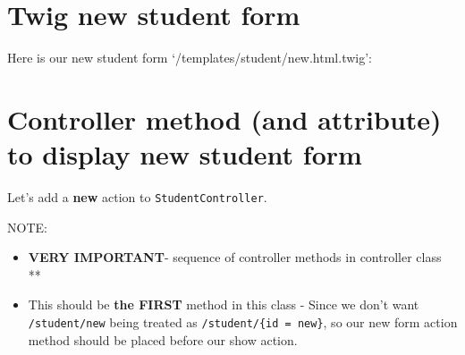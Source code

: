 \documentclass[a4paperpaper,openright]{book}
\newenvironment{Shaded}{}{}
\newcommand{\KeywordTok}[1]{\textcolor[rgb]{0.00,0.44,0.13}{\textbf{#1}}}
\newcommand{\NormalTok}[1]{#1}
\newcommand{\OtherTok}[1]{\textcolor[rgb]{0.00,0.44,0.13}{#1}}
\newcommand{\StringTok}[1]{\textcolor[rgb]{0.25,0.44,0.63}{#1}}
\begin{document}
\hypertarget{twig-new-student-form}{%
\section{Twig new student form}\label{twig-new-student-form}}

Here is our new student form `/templates/student/new.html.twig':

\begin{Shaded}
\end{Shaded}

\hypertarget{controller-method-and-attribute-to-display-new-student-form}{%
\section{Controller method (and attribute) to display new student
form}\label{controller-method-and-attribute-to-display-new-student-form}}

Let's add a \textbf{new} action to \texttt{StudentController}.

NOTE:

\begin{itemize}
\item
  \textbf{VERY IMPORTANT}- sequence of controller methods in controller
  class **
\item
  This should be \textbf{the FIRST} method in this class - Since we
  don't want \texttt{/student/new} being treated as
  \texttt{/student/\{id\ =\ \textquotesingle{}new\textquotesingle{}\}},
  so our new form action method should be placed before our show action.
\end{itemize}
\end{document}
